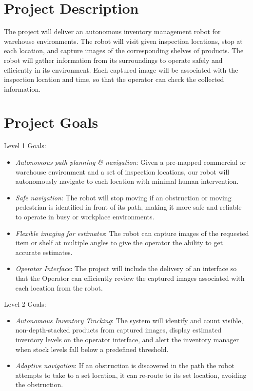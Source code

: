 \documentclass{article}
\begin{document}
\newpage

\tableofcontents

\newpage{}

\section{Project Description}

The project will deliver an autonomous inventory management robot for warehouse environments. The robot will visit given inspection locations, stop at each location, and capture images of the corresponding shelves of products. The robot will gather information from its surroundings to operate safely and efficiently in its environment. Each captured image will be associated with the inspection location and time, so that the operator can check the collected information. 

\section{Project Goals}

Level 1 Goals:

\begin{itemize}
	\item \textit{Autonomous path planning \& navigation}: Given a pre-mapped commercial or warehouse environment and a set of inspection locations, our robot will autonomously navigate to each location with minimal human intervention.
	
	\item \textit{Safe navigation}: The robot will stop moving if an obstruction or moving pedestrian is identified in front of its path, making it more safe and reliable to operate in busy or workplace environments.
	
	\item \textit{Flexible imaging for estimates}: The robot can capture images of the requested item or shelf at multiple angles to give the operator the ability to get accurate estimates.
	
	\item \textit{Operator Interface}: The project will include the delivery of an interface so that the Operator can efficiently review the captured images associated with each location from the robot.
	
\end{itemize}
Level 2 Goals:
\begin{itemize}
	\item \textit{Autonomous Inventory Tracking}: The system will identify and count visible, non-depth-stacked products from captured images, display estimated inventory levels on the operator interface, and alert the inventory manager when stock levels fall below a predefined threshold.
	
	
	\item \textit{Adaptive navigation}: If an obstruction is discovered in the path the robot attempts to take to a set location, it can re-route to its set location, avoiding the obstruction.
	
\end{itemize}
\end{document}

